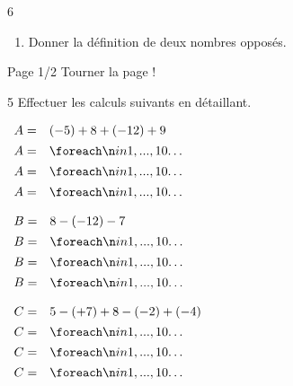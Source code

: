 \documentclass[a4paper]{book}
\begin{document}
{\begin{exerciceNote}{6}
\begin{enumerate}
            \medskip

            \item Donner la définition de deux nombres opposés.

            \points[38]
        \end{enumerate}
    \end{exerciceNote}


\vfill
Page 1/2 \hfill Tourner la page !
\newpage


    \begin{exerciceNote}{5}
        Effectuer les calculs suivants en détaillant.

        \begin{minipage}{0.30\linewidth}
            $\begin{array}{ll}
                A = & (-5)+8+(-12)+9 \\[1ex]
                A = & \points[10]\\[1ex]
                A = & \points[10]\\[1ex]
                A = & \points[10]
            \end{array}$

            \vspace{1cm}

            $\begin{array}{ll}
                B = & 8-(-12)-7 \\[1ex]
                B = & \points[10]\\[1ex]
                B = & \points[10]\\[1ex]
                B = & \points[10]
            \end{array}$
        \end{minipage}
        \hfill
        \begin{minipage}{0.30\linewidth}
            $\begin{array}{ll}
                C = & 5-(+7)+8-(-2)+(-4) \\[1ex]
                C = & \points[10] \\[1ex]
                C = & \points[10] \\[1ex]
                C = & \points[10]
            \end{array}$

            \vspace{1cm}


\end{minipage}
\end{exerciceNote}}
\end{document}

